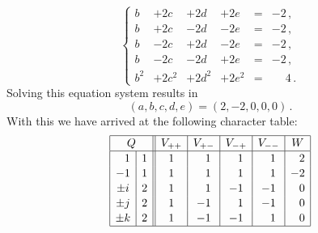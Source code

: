 \begin{example}
  \[
    \left\{
      \begin{array}{lllllcl}
        b   & + 2c    & + 2d    & + 2e    &=&           -2 \,, \\
        b   & + 2c    & - 2d    & - 2e    &=&           -2 \,, \\
        b   & - 2c    & + 2d    & - 2e    &=&           -2 \,, \\
        b   & - 2c    & - 2d    & + 2e    &=&           -2 \,, \\
        b^2 & + 2c^2  & + 2d^2  & + 2e^2  &=& \phantom{-}4 \,.
      \end{array}
    \right.
  \]
  Solving this equation system results in
  \[
      (a,b,c,d,e)
    = (2,-2,0,0,0) \,.
  \]
  With this we have arrived at the following character table:
  \[
    \begingroup
    \renewcommand{\arraystretch}{1.1}
    \begin{array}{|c|c||c|c|c|c|c|}
      \hline
        \multicolumn{2}{|c||}{Q}
      & V_{++}
      & V_{+-}
      & V_{-+}
      & V_{--}
      & W
      \\
      \hline
       \phantom{-}1
      & 1
      &            1
      & \phantom{-}1
      & \phantom{-}1
      & \phantom{-}1
      & \phantom{-}2
      \\
        -1
      & 1
      &            1
      & \phantom{-}1
      & \phantom{-}1
      & \phantom{-}1
      &           -2
      \\
        \pm i
      & 2
      &            1
      & \phantom{-}1
      &           -1
      &           -1
      & \phantom{-}0
      \\
        \pm j
      & 2
      &            1
      &           -1
      & \phantom{-}1
      &           -1
      & \phantom{-}0
      \\
        \pm k
      & 2
      &            1
      &           -1
      &           -1
      & \phantom{-}1
      & \phantom{-}0
      \\
      \hline
    \end{array}
    \endgroup
  \]
  

\end{example}

